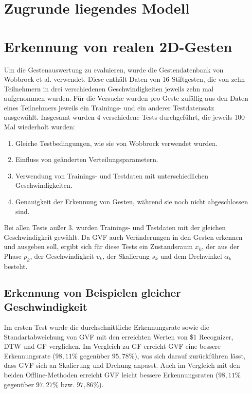 \documentclass{llncs}
\begin{document}
\section{Zugrunde liegendes Modell}


\section{Erkennung von realen 2D-Gesten}
Um die Gestenauswertung zu evaluieren, wurde die Gestendatenbank von Wobbrock et al.\cite{Wobbrock2007} verwendet. Diese enthält Daten von 16 Stiftgesten, die von zehn Teilnehmern in drei verschiedenen Geschwindigkeiten jeweils zehn mal aufgenommen wurden. Für die Versuche wurden pro Geste zufällig aus den Daten eines Teilnehmers jeweils ein Trainings- und ein anderer Testdatensatz ausgewählt. Insgesamt wurden 4 verschiedene Tests durchgeführt, die jeweils 100 Mal wiederholt wurden:
\begin{enumerate}
\item Gleiche Testbedingungen, wie sie von Wobbrock\cite{Wobbrock2007} verwendet wurden.
\item Einfluss von geänderten Verteilungsparametern.
\item Verwendung von Trainings- und Testdaten mit unterschiedlichen Geschwindigkeiten.
\item Genauigkeit der Erkennung von Gesten, während sie noch nicht abgeschlossen sind.
\end{enumerate}
Bei allen Tests außer 3. wurden Trainings- und Testdaten mit der gleichen Geschwindigkeit gewählt.
Da GVF auch Veränderungen in den Gesten erkennen und ausgeben soll, ergibt sich für diese Tests ein Zustandsraum $x_k$, der aus der Phase $p_k$, der Geschwindigkeit $v_k$, der Skalierung $s_k$ und dem Drehwinkel $\alpha_k$ besteht.

\subsection{Erkennung von Beispielen gleicher Geschwindigkeit}
Im ersten Test wurde die durchschnittliche Erkennungsrate sowie die Standartabweichung von GVF mit den erreichten Werten von \$1 Recognizer\cite{Wobbrock2007}, DTW und GF verglichen. 
Im Vergleich zu GF erreicht GVF eine bessere Erkennungsrate ($98,11 \%$ gegenüber $95,78\%$), was sich darauf zurückführen lässt, dass GVF sich an Skalierung und Drehung anpasst.
Auch im Vergleich mit den beiden Offline-Methoden erreicht GVF leicht bessere Erkennungsraten ($98,11\%$ gegenüber $97,27\%$ bzw. $97,86\%$).
\end{document}
